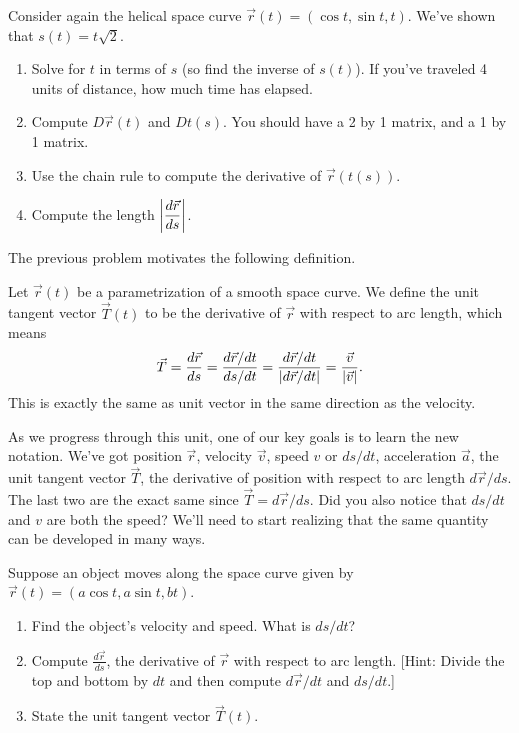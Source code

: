 \begin{problem}
Consider again the helical space curve $\vec r(t)=(\cos t, \sin t, t)$.  We've shown that $s(t) = t\sqrt{2}$. 
\begin{enumerate}
 \item Solve for $t$ in terms of $s$ (so find the inverse of $s(t)$). If you've traveled 4 units of distance, how much time has elapsed.   
 \item Compute $D\vec r(t)$ and $Dt(s)$.  You should have a 2 by 1 matrix, and a 1 by 1 matrix. 
 \item Use the chain rule to compute the derivative of $\vec r(t(s))$.
 \item Compute the length $\left|\displaystyle\frac{d\vec r}{ds}\right|$.
\end{enumerate}
\end{problem}

The previous problem motivates the following definition.

\begin{definition}\label{def unit tangent vector}
 Let $\vec r(t)$ be a parametrization of a smooth space curve. We define the unit tangent vector $\vec T(t)$ to be the derivative of $\vec r$ with respect to arc length, which means
$$\vec T = \displaystyle\frac{d\vec r}{ds}=\displaystyle\frac{d\vec r/dt}{ds/dt} = \frac{d\vec r/dt}{|d \vec r/dt|} = \frac{\vec v}{|\vec v|}.$$
This is exactly the same as unit vector in the same direction as the velocity.
\end{definition}

As we progress through this unit, one of our key goals is to learn the new notation.  We've got position $\vec r$,  velocity $\vec v$, speed $v$ or $ds/dt$, acceleration $\vec a$, the unit tangent vector $\vec T$, the derivative of position with respect to arc length $d\vec r/ds$.  The last two are the exact same since $\vec T = d\vec r/ds$. Did you also notice that $ds/dt$ and $v$ are both the speed?  We'll need to start realizing that the same quantity can be developed in many ways. 

\begin{problem}
%
 Suppose an object moves along the space curve given by  $\vec r(t)=(a\cos t,a\sin t,b t)$. 
\begin{enumerate}
 \item Find the object's velocity and speed. What is $ds/dt$?
 \item Compute $\frac{d\vec r}{ds}$, the derivative of $\vec r$ with respect to arc length. [Hint: Divide the top and bottom by $dt$ and then compute $d\vec r/dt$ and $ds/dt$.]  
 \item State the unit tangent vector $\vec T(t)$.
\end{enumerate}
\end{problem}


